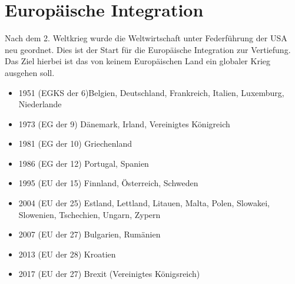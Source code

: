 \section{Europäische Integration}
Nach dem 2. Weltkrieg wurde die Weltwirtschaft unter Federführung der USA neu geordnet. Dies ist der Start für die Europäische Integration zur Vertiefung. Das Ziel hierbei ist das von keinem Europäischen Land ein globaler Krieg ausgehen soll. 
\begin{itemize}
	\item 1951 (EGKS der 6)Belgien, Deutschland, Frankreich, Italien, Luxemburg, Niederlande
	\item 1973 (EG der 9) Dänemark, Irland, Vereinigtes Königreich
	\item 1981 (EG der 10) Griechenland
	\item 1986 (EG der 12) Portugal, Spanien
	\item 1995 (EU der 15) Finnland, Österreich, Schweden
	\item 2004 (EU der 25) Estland, Lettland, Litauen, Malta, Polen, Slowakei, Slowenien, Tschechien, Ungarn, Zypern
	\item 2007 (EU der 27) Bulgarien, Rumänien
	\item 2013 (EU der 28) Kroatien
	\item 2017 (EU der 27) Brexit (Vereinigtes Königsreich)
\end{itemize}